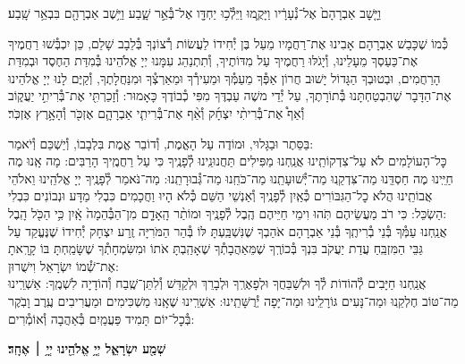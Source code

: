 \documentclass[twoside, openany, parskip=half, 11pt]{book}
\begin{document}
וַיָּ֤שׇׁב אַבְרָהָם֙ אֶל־נְ֯עָרָ֔יו וַיָּקֻ֛מוּ וַיֵּלְ֯כ֥וּ יַחְדָּ֖ו אֶל־בְּ֯אֵ֣ר שָׁ֑בַע וַיֵּ֥שֶׁב אַבְרָהָ֖ם בִּבְאֵ֥ר שָֽׁבַע׃

כְּ֯מוֹ שֶׁכָּבַשׁ אַבְרָהָם אָבִינוּ אֶת־רַחֲמָיו מֵעַל בֶּן יְ֯חִידוֹ לַעֲשׂוֹת רְ֯צוֹנְךָ בְּ֯לֵבָב שָׁלֵם, כֵּן יִכְבְּ֯שׁוּ רַחֲמֶיךָ אֶת־כַּעַסְךָ מֵעָלֵינוּ, וְ֯יָגֹלּוּ רַחֲמֶיךָ עַל מִדּוֹתֶיךָ, וְ֯תִתְנַהֵג עִמָּנוּ יְיָ אֱלֹהֵינוּ בְּ֯מִדַּת הַחֶסֶד וּבְמִדַּת הָרַחֲמִים, וּבְטוּבְךָ הַגָּדוֹל יָשׁוּב חֲרוֹן אַפְּ֯ךָ מֵעַמְּ֯ךָ וּמֵעִירְ֯ךָ וּמֵאַרְצְ֯ךָ וּמִנַּחֲלָתֶךָ, וְ֯קַיֶּם לָנוּ יְיָ אֱלֹהֵינוּ אֶת־הַדָּבָר שֶׁהִבְטַחְתָּנוּ בְּ֯תוֹרָתֶךָ, עַל יְ֯דֵי משֶׁה עַבְדֶּךָ מִפִּי כְ֯בוֹדֶךָ כָּאָמוּר: וְ֯זָכַרְתִּ֖י אֶת־בְּ֯רִיתִ֣י יַעֲק֑וֹב וְ֯אַף֩ אֶת־בְּ֯רִיתִ֨י יִצְחָ֜ק וְ֯אַ֨ף אֶת־בְּ֯רִיתִ֧י אַבְרָהָ֛ם אֶזְכֹּ֖ר וְ֯הָאָ֥רֶץ אֶזְכֹּֽר׃

בַּסֵּתֶר וּבַגָּלוּי, וּמוֹדֶה עַל הָאֱמֶת, וְ֯דוֹבֵר אֱמֶת בִּלְבָבוֹ, וְ֯יַשְׁכֵּם וְ֯יֹאמַר: \\
כׇּל־הָעוֹלָמִים לֹא עַל־צִדְקוֹתֵֽינוּ אֲנַֽחְנוּ מַפִּילִים תַּחֲנוּנֵֽינוּ לְ֯פָנֶֽיךָ כִּי עַל רַחֲמֶֽיךָ הָרַבִּים: מָה אָֽנוּ מֶה חַיֵּֽינוּ מֶה חַסְדֵּֽנוּ מַה־צִּדְקֵֽנוּ מַה־יְּ֯שׁוּעָתֵֽנוּ מַה־כֹּחֵֽנוּ מַה־גְּ֯בוּרָתֵֽנוּ: מַה־נֹּאמַר לְ֯פָנֶֽיךָ יְיָ אֱלֹהֵֽינוּ וֵאלֹהֵי אֲבוֹתֵֽינוּ הֲלֹא כׇל־הַגִּבּוֹרִים כְּ֯אַֽיִן לְ֯פָנֶֽיךָ וְ֯אַנְשֵׁי הַשֵּׁם כְּ֯לֹא הָיוּ וַחֲכָמִים כִּבְלִי מַדָּע וּנְבוֹנִים כִּבְלִי הַשְׂכֵּל: כִּי רֹב מַעֲשֵׂיהֶם תֹּֽהוּ וִימֵי חַיֵּיהֶם הֶֽבֶל לְ֯פָנֶֽיךָ וּמוֹתַ֨ר הָֽאָדָ֤ם מִן־הַבְּ֯הֵמָה֙ אָֽ֔יִן כִּ֥י הַכֹּ֖ל הָֽבֶל: \\
אֲנַֽחְנוּ עַמְּ֯ךָ בְּ֯נֵי בְ֯רִיתֶֽךָ בְּ֯נֵי אַבְרָהָם אֹהַבְךָ שֶׁנִּשְׁבַּֽעְתָּ לּוֹ בְּ֯הַר הַמֹּרִיָּה זֶֽרַע יִצְחָק יְ֯חִידוֹ שֶׁנֶּעֱקַד עַל גַּבֵּי הַמִּזְבֵּֽחַ עֲדַת יַעֲקֹב בִּנְךָ בְּ֯כוֹרֶֽךָ שֶׁמֵּאַהֲבָתְ֯ךָ שֶׁאָהַֽבְתָּ אֹתוֹ וּמִשִּׂמְחָתְ֯ךָ שֶׁשָּׂמַֽחְתָּ בּוֹ קָרָֽאתָ אֶת־שְׁ֯מוֹ יִשְׂרָאֵל וִישֻׁרוּן: \\
אֲנַֽחְנוּ חַיָּבִים לְ֯הוֹדוֹת לְ֯ךָ וּלְשַׁבֵּחֲךָ וּלְפָאֶרְֽךָ וּלְבָרֵךְ וּלְקַדֵּשׁ וְ֯לִתֵּן־שֶֽׁבַח וְ֯הוֹדָיָה לִשְׁמֶֽךָ: אַשְׁרֵֽינוּ מַה־טּוֹב חֶלְקֵֽנוּ וּמַה־נָּעִים גּוֹרָלֵֽינוּ וּמַה־יָּפָה יְ֯רֻשָּׁתֵֽינוּ: אַשְׁרֵֽינוּ שֶׁאָֽנוּ מַשְׁכִּימִים וּמַעֲרִיבִים עֶֽרֶב וָבֹֽקֶר בְּ֯כׇל־יוֹם תָּמִיד פַּעֲמַֽיִם בְּ֯אַהֲבָה וְ֯אוֹמְ֯רִים:

\begin{Large}
\textbf{שְׁמַ֖ע יִשְׂרָאֵ֑ל יְיָ֥ אֱלֹהֵ֖ינוּ יְיָ֥ ׀ אֶחָֽד׃}
\end{Large}
\end{document}

